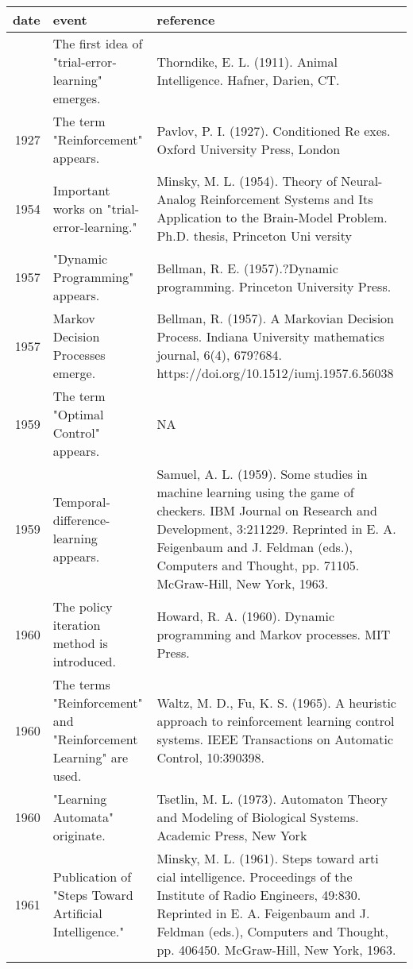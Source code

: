 \documentclass[
  letterpaper,
  DIV=11,
  numbers=noendperiod]{scrreprt}
\begin{document}
\begingroup
\fontsize{12.0pt}{14.4pt}\selectfont
\setlength{\LTpost}{0mm}
\begin{longtable*}{rll}
\toprule
date & event & reference \\ 
\midrule{} & The first idea of "trial-error-learning" emerges. & Thorndike, E. L. (1911). Animal Intelligence. Hafner, Darien, CT. \\ 
{1927} & The term "Reinforcement" appears. & Pavlov, P. I. (1927). Conditioned Re exes. Oxford University Press, London \\ 
{1954} & Important works on "trial-error-learning." & Minsky, M. L. (1954). Theory of Neural-Analog Reinforcement Systems and
 Its Application to the Brain-Model Problem. Ph.D. thesis, Princeton Uni
versity \\ 
{1957} & "Dynamic Programming" appears. & Bellman, R. E. (1957).?Dynamic programming. Princeton University Press. \\ 
{1957} & Markov Decision Processes emerge. & Bellman, R. (1957). A Markovian Decision Process. Indiana University mathematics journal, 6(4), 679?684. https://doi.org/10.1512/iumj.1957.6.56038 \\ 
{1959} & The term "Optimal Control" appears. & NA \\ 
{1959} & Temporal-difference-learning appears. & Samuel, A. L. (1959). Some studies in machine learning using the game
 of checkers.
 IBM Journal on Research and Development, 3:211229.
 Reprinted in E. A. Feigenbaum and J. Feldman (eds.), Computers and
 Thought, pp. 71105. McGraw-Hill, New York, 1963. \\ 
{1960} & The policy iteration method is introduced. & Howard, R. A. (1960). Dynamic programming and Markov processes. MIT Press.
 \\ 
{1960} & The terms "Reinforcement" and "Reinforcement Learning" are used. & Waltz, M. D., Fu, K. S. (1965). A heuristic approach to reinforcement learning
 control systems. IEEE Transactions on Automatic Control, 10:390398. \\ 
{1960} & "Learning Automata" originate. & Tsetlin, M. L. (1973). Automaton Theory and Modeling of Biological Systems.
 Academic Press, New York \\ 
{1961} & Publication of "Steps Toward Artificial Intelligence." & Minsky, M. L. (1961). Steps toward arti cial intelligence. Proceedings of the
 Institute of Radio Engineers, 49:830. Reprinted in E. A. Feigenbaum and
 J. Feldman (eds.), Computers and Thought, pp. 406450. McGraw-Hill,
 New York, 1963. \\ 

\end{longtable*}
\end{document}
